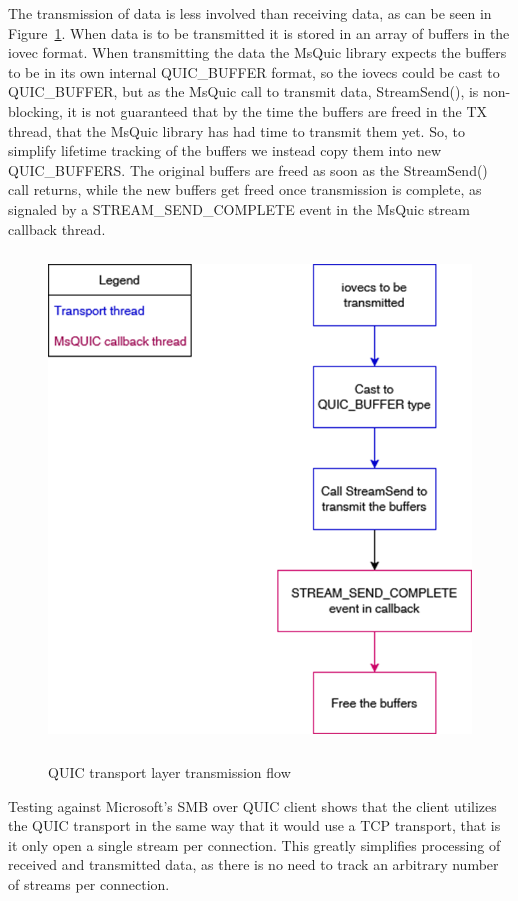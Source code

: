 \documentclass[english, 12pt, a4paper, elec, utf8, a-2b, online]{aaltothesis}
\begin{document}
The transmission of data is less involved than receiving data, as can be seen
in Figure~\ref{fig:msquic_tx}. When data is to be transmitted it is stored in
an array of buffers in the iovec format. When transmitting the data the MsQuic
library expects the buffers to be in its own internal QUIC\_BUFFER format,
so the iovecs could be cast to QUIC\_BUFFER, but as the MsQuic call to transmit
data, StreamSend(), is non-blocking, it is not guaranteed that by the time the buffers
are freed in the TX thread, that the MsQuic library has had time to transmit them yet.
So, to simplify lifetime tracking of the buffers we instead copy them into new QUIC\_BUFFERS.
The original buffers are freed as soon as the StreamSend() call returns, while the new
buffers get freed once transmission is complete, as signaled by a STREAM\_SEND\_COMPLETE
event in the MsQuic stream callback thread.
\begin{figure}[h]
	\centering
	\includegraphics[alt={Block diagram of the flow when sending data using the MsQuic library}, height=13cm]{./images/send_flow.png}
	\caption{QUIC transport layer transmission flow}
	\label{fig:msquic_tx}
\end{figure}

Testing against Microsoft's SMB over QUIC client shows that the client utilizes the
QUIC transport in the same way that it would use a TCP transport, that is it only
open a single stream per connection. This greatly simplifies processing of received
and transmitted data, as there is no need to track an arbitrary number of streams
per connection.
\end{document}
